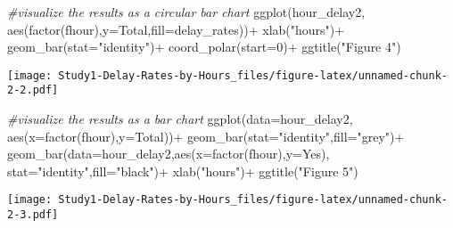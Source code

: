\documentclass[
]{article}
\newenvironment{Shaded}{\begin{snugshade}}{\end{snugshade}}
\newcommand{\AttributeTok}[1]{\textcolor[rgb]{0.77,0.63,0.00}{#1}}
\newcommand{\CommentTok}[1]{\textcolor[rgb]{0.56,0.35,0.01}{\textit{#1}}}
\newcommand{\DecValTok}[1]{\textcolor[rgb]{0.00,0.00,0.81}{#1}}
\newcommand{\FunctionTok}[1]{\textcolor[rgb]{0.00,0.00,0.00}{#1}}
\newcommand{\NormalTok}[1]{#1}
\newcommand{\SpecialCharTok}[1]{\textcolor[rgb]{0.00,0.00,0.00}{#1}}
\newcommand{\StringTok}[1]{\textcolor[rgb]{0.31,0.60,0.02}{#1}}
\begin{document}
\begin{Shaded}
\begin{Highlighting}[]
\CommentTok{\#visualize the results as a circular bar chart}
\FunctionTok{ggplot}\NormalTok{(hour\_delay2, }\FunctionTok{aes}\NormalTok{(}\FunctionTok{factor}\NormalTok{(fhour),}\AttributeTok{y=}\NormalTok{Total,}\AttributeTok{fill=}\NormalTok{delay\_rates))}\SpecialCharTok{+}
  \FunctionTok{xlab}\NormalTok{(}\StringTok{"hours"}\NormalTok{)}\SpecialCharTok{+}
  \FunctionTok{geom\_bar}\NormalTok{(}\AttributeTok{stat=}\StringTok{"identity"}\NormalTok{)}\SpecialCharTok{+}
  \FunctionTok{coord\_polar}\NormalTok{(}\AttributeTok{start=}\DecValTok{0}\NormalTok{)}\SpecialCharTok{+}
  \FunctionTok{ggtitle}\NormalTok{(}\StringTok{"Figure 4"}\NormalTok{)}
\end{Highlighting}
\end{Shaded}

\texttt{[image: Study1-Delay-Rates-by-Hours\_files/figure-latex/unnamed-chunk-2-2.pdf]}

\begin{Shaded}
\begin{Highlighting}[]
\CommentTok{\#visualize the results as a bar chart}
\FunctionTok{ggplot}\NormalTok{(}\AttributeTok{data=}\NormalTok{hour\_delay2, }\FunctionTok{aes}\NormalTok{(}\AttributeTok{x=}\FunctionTok{factor}\NormalTok{(fhour),}\AttributeTok{y=}\NormalTok{Total))}\SpecialCharTok{+}
  \FunctionTok{geom\_bar}\NormalTok{(}\AttributeTok{stat=}\StringTok{"identity"}\NormalTok{,}\AttributeTok{fill=}\StringTok{"grey"}\NormalTok{)}\SpecialCharTok{+}
  \FunctionTok{geom\_bar}\NormalTok{(}\AttributeTok{data=}\NormalTok{hour\_delay2,}\FunctionTok{aes}\NormalTok{(}\AttributeTok{x=}\FunctionTok{factor}\NormalTok{(fhour),}\AttributeTok{y=}\NormalTok{Yes),}
    \AttributeTok{stat=}\StringTok{"identity"}\NormalTok{,}\AttributeTok{fill=}\StringTok{"black"}\NormalTok{)}\SpecialCharTok{+}
    \FunctionTok{xlab}\NormalTok{(}\StringTok{"hours"}\NormalTok{)}\SpecialCharTok{+}
  \FunctionTok{ggtitle}\NormalTok{(}\StringTok{"Figure 5"}\NormalTok{)}
\end{Highlighting}
\end{Shaded}

\texttt{[image: Study1-Delay-Rates-by-Hours\_files/figure-latex/unnamed-chunk-2-3.pdf]}
\end{document}
